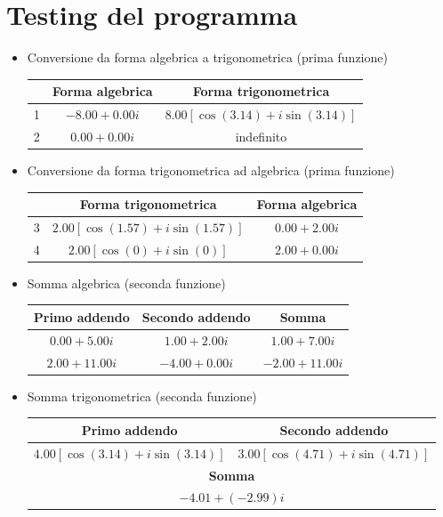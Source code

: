 \documentclass[a4paper,10pt]{article}
\begin{document}
\newpage

\section*{ \textbf{Testing del programma} }

\begin{itemize}
    \item Conversione da forma algebrica a trigonometrica (prima funzione)\\
    	\begin{tabular}{|*3{c|}}
	\hline
			& \textbf{Forma algebrica}	& \textbf{Forma trigonometrica}\\
	\hline
	1		& $-8.00 + 0.00 i$		& $8.00[\cos{\left(3.14\right)} + i\sin{\left(3.14\right)}]$\\
	\hline
	2		& $0.00 + 0.00 i$		& indefinito\\
	\hline
	\end{tabular}
    \item Conversione da forma trigonometrica ad algebrica (prima funzione)\\
    	\begin{tabular}{|*3{c|}}
	\hline
			& \textbf{Forma trigonometrica}					& \textbf{Forma algebrica}\\
	\hline
	3		& $2.00[\cos{\left(1.57\right)} + i\sin{\left(1.57\right)}]$	& $0.00 + 2.00 i$\\
	\hline
	4		& $2.00[\cos{\left(0\right)} + i\sin{\left(0\right)}]$		& $2.00 + 0.00 i$\\
	\hline
	\end{tabular}

    \item Somma algebrica (seconda funzione)\\
    	\begin{tabular}{|*3{c|}}
	\hline
	Primo addendo			& Secondo addendo		& Somma\\
	\hline
	$0.00 + 5.00 i$			& $1.00 + 2.00 i$		& $1.00 + 7.00 i$\\ 
	\hline
	$2.00 + 11.00 i$		& $-4.00 + 0.00 i$		& $-2.00 + 11.00 i$\\
	\hline
	\end{tabular}

    \item Somma trigonometrica (seconda funzione)\\
    	\begin{tabular}{|*2{c|}}
	\hline
	\bfseries Primo addendo						& \bfseries Secondo addendo\\
	\hline
	$4.00[\cos{\left(3.14\right)} + i\sin{\left(3.14\right)}]$	& $3.00[\cos{\left(4.71\right)} + i\sin{\left(4.71\right)}]$\\
	\hline
	\multicolumn{2}{|c|}{\textbf{Somma}}\\
	\hline
	\multicolumn{2}{|c|}{$-4.01 + (-2.99)i$}\\
	\hline
	\end{tabular}


\end{itemize}
\end{document}
